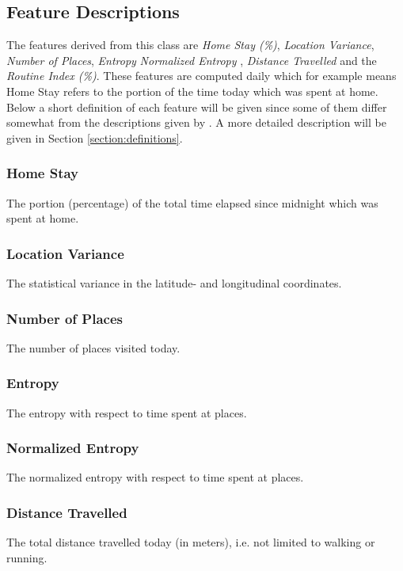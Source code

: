 \subsection{Feature Descriptions}
The features derived from this class are \textit{Home Stay (\%)}, \textit{Location Variance}, \textit{Number of Places}, \textit{Entropy} \textit{Normalized Entropy} , \textit{Distance Travelled} and the \textit{Routine Index (\%)}. These features are computed daily which for example means Home Stay refers to the portion of the time today which was spent at home. Below a short definition of each feature will be given since some of them differ somewhat from the descriptions given by \cite{Canzian2015,Saeb2015}. A more detailed description will be given in Section \ref{section:definitions}.

\subsubsection*{Home Stay}
The portion (percentage) of the total time elapsed since midnight which was spent at home. 

\subsubsection*{Location Variance}
The statistical variance in the latitude- and longitudinal coordinates.

\subsubsection*{Number of Places}
The number of places visited today.

\subsubsection*{Entropy}
The entropy with respect to time spent at places.

\subsubsection*{Normalized Entropy}
The normalized entropy with respect to time spent at places.

\subsubsection*{Distance Travelled}
The total distance travelled today (in meters), i.e. not limited to walking or running.

